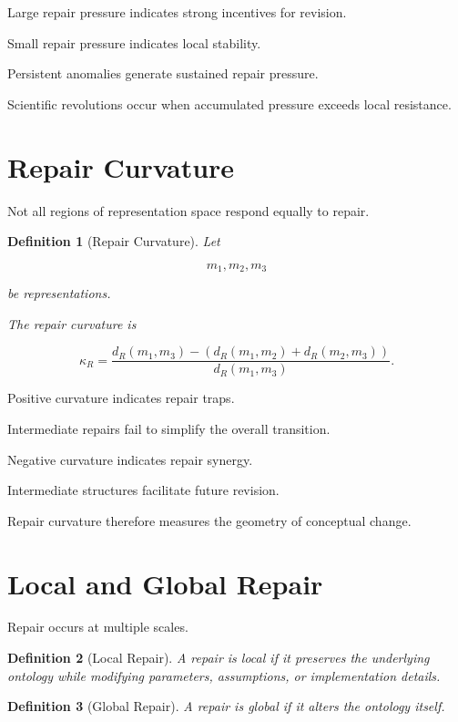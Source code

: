\documentclass[11pt,oneside,openany]{book}
\newtheorem{definition}{Definition}[chapter] \newtheorem{theorem}{Theorem}[chapter] \newtheorem{proposition}{Proposition}[chapter] \newtheorem{lemma}{Lemma}[chapter] \newtheorem{corollary}{Corollary}[chapter] \newtheorem{remark}{Remark}[chapter]
\begin{document}
Large repair pressure indicates strong incentives for revision.

Small repair pressure indicates local stability.

Persistent anomalies generate sustained repair pressure.

Scientific revolutions occur when accumulated pressure exceeds local resistance.

\section{Repair Curvature}

Not all regions of representation space respond equally to repair.

\begin{definition}[Repair Curvature]

Let

\[
m_1,m_2,m_3
\]

be representations.

The repair curvature is

\[
\kappa_R
=
\frac{
d_R(m_1,m_3)
-
\left(
d_R(m_1,m_2)
+
d_R(m_2,m_3)
\right)
}{
d_R(m_1,m_3)
}.
\]

\end{definition}

Positive curvature indicates repair traps.

Intermediate repairs fail to simplify the overall transition.

Negative curvature indicates repair synergy.

Intermediate structures facilitate future revision.

Repair curvature therefore measures the geometry of conceptual change.

\section{Local and Global Repair}

Repair occurs at multiple scales.

\begin{definition}[Local Repair]

A repair is local if it preserves the underlying ontology while modifying parameters, assumptions, or implementation details.

\end{definition}

\begin{definition}[Global Repair]

A repair is global if it alters the ontology itself.

\end{definition}
\end{document}
